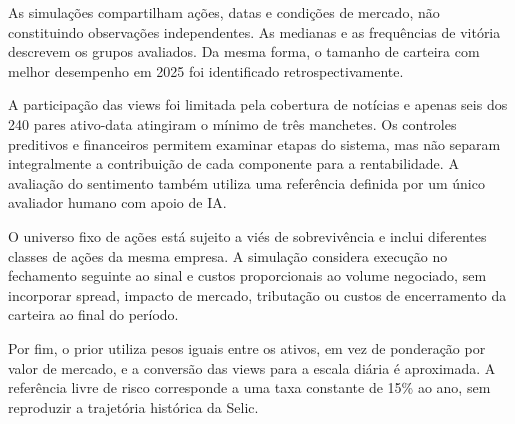 As simulações compartilham ações, datas e condições de
mercado, não constituindo observações independentes.
As medianas e as frequências de vitória descrevem os
grupos avaliados. Da mesma forma, o tamanho de carteira
com melhor desempenho em 2025 foi identificado
retrospectivamente.

A participação das views foi limitada pela cobertura
de notícias e apenas seis dos 240 pares ativo-data
atingiram o mínimo de três manchetes. Os controles
preditivos e financeiros permitem examinar etapas do
sistema, mas não separam integralmente a contribuição
de cada componente para a rentabilidade. A avaliação
do sentimento também utiliza uma referência definida
por um único avaliador humano com apoio de IA.

O universo fixo de ações está sujeito a viés de
sobrevivência e inclui diferentes classes de ações
da mesma empresa. A simulação considera execução no
fechamento seguinte ao sinal e custos proporcionais
ao volume negociado, sem incorporar spread, impacto
de mercado, tributação ou custos de encerramento
da carteira ao final do período.

Por fim, o prior utiliza pesos iguais entre os ativos,
em vez de ponderação por valor de mercado, e a conversão
das views para a escala diária é aproximada. A referência
livre de risco corresponde a uma taxa constante de
15\% ao ano, sem reproduzir a trajetória histórica
da Selic.